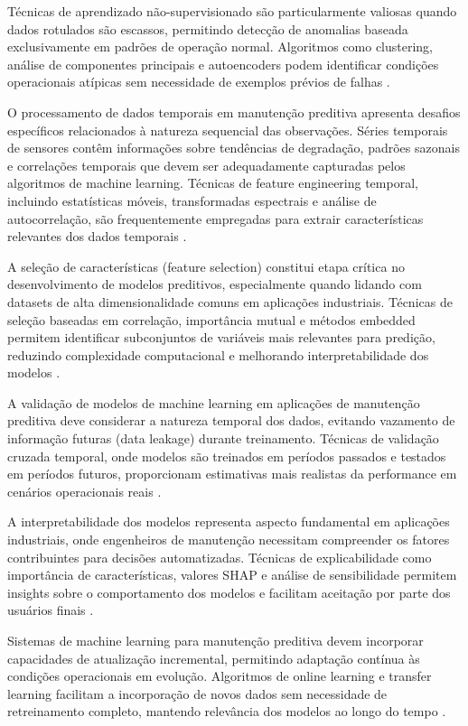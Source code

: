 Técnicas de aprendizado não-supervisionado são particularmente valiosas quando dados rotulados são escassos, permitindo detecção de anomalias baseada exclusivamente em padrões de operação normal. Algoritmos como clustering, análise de componentes principais e autoencoders podem identificar condições operacionais atípicas sem necessidade de exemplos prévios de falhas \cite{zhao2019machine}.

O processamento de dados temporais em manutenção preditiva apresenta desafios específicos relacionados à natureza sequencial das observações. Séries temporais de sensores contêm informações sobre tendências de degradação, padrões sazonais e correlações temporais que devem ser adequadamente capturadas pelos algoritmos de machine learning. Técnicas de feature engineering temporal, incluindo estatísticas móveis, transformadas espectrais e análise de autocorrelação, são frequentemente empregadas para extrair características relevantes dos dados temporais \cite{wang2019deep}.

A seleção de características (feature selection) constitui etapa crítica no desenvolvimento de modelos preditivos, especialmente quando lidando com datasets de alta dimensionalidade comuns em aplicações industriais. Técnicas de seleção baseadas em correlação, importância mutual e métodos embedded permitem identificar subconjuntos de variáveis mais relevantes para predição, reduzindo complexidade computacional e melhorando interpretabilidade dos modelos \cite{guyon2003introduction}.

A validação de modelos de machine learning em aplicações de manutenção preditiva deve considerar a natureza temporal dos dados, evitando vazamento de informação futuras (data leakage) durante treinamento. Técnicas de validação cruzada temporal, onde modelos são treinados em períodos passados e testados em períodos futuros, proporcionam estimativas mais realistas da performance em cenários operacionais reais \cite{cerqueira2020evaluating}.

A interpretabilidade dos modelos representa aspecto fundamental em aplicações industriais, onde engenheiros de manutenção necessitam compreender os fatores contribuintes para decisões automatizadas. Técnicas de explicabilidade como importância de características, valores SHAP e análise de sensibilidade permitem insights sobre o comportamento dos modelos e facilitam aceitação por parte dos usuários finais \cite{arrieta2020explainable}.

Sistemas de machine learning para manutenção preditiva devem incorporar capacidades de atualização incremental, permitindo adaptação contínua às condições operacionais em evolução. Algoritmos de online learning e transfer learning facilitam a incorporação de novos dados sem necessidade de retreinamento completo, mantendo relevância dos modelos ao longo do tempo \cite{khamassi2018discussion}.

